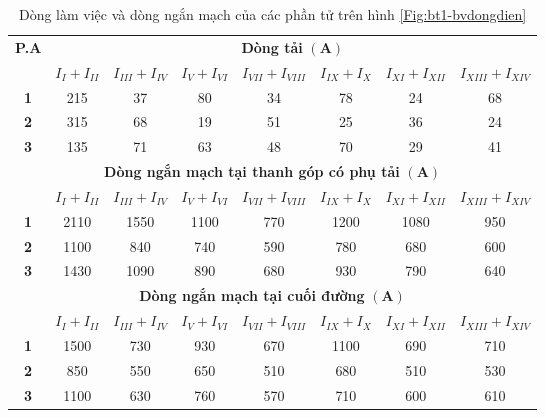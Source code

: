 \documentclass[12pt,a4paper]{article}
\begin{document}
\begin{enumerate}[1.]
			\begin{table}[!h]
				\begin{center}		
					\begin{tabular}{|c|c|c|c|c|c|c|c|} \hline 
							\multirow{2}{.7cm}{\textbf{P.A}} & \multicolumn{7}{c|}{\textbf{Dòng tải} $\mathbf{(A)}$} \\ \cline{2-8}
							 & $I_{I} + I_{II}$ & $I_{III} + I_{IV}$ & $I_{V} + I_{VI}$ & $I_{VII} + I_{VIII}$ & $I_{IX} + I_{X}$ & $I_{XI} + I_{XII}$ & $I_{XIII} + I_{XIV}$ \\ \hline
							\textbf{1} & 215 & 37 & 80 & 34 & 78 & 24 & 68 \\ \hline 
							\textbf{2} & 315 & 68 & 19 & 51 & 25 & 36 & 24 \\ \hline 
							\textbf{3} & 135 & 71 & 63 & 48 & 70 & 29 & 41 \\ \hline 
							\multicolumn{8}{|c|}{\textbf{Dòng ngắn mạch tại thanh góp có phụ tải} $\mathbf{(A)}$} \\ \hline 
							 & $I_{I} + I_{II}$ & $I_{III} + I_{IV}$ & $I_{V} + I_{VI}$ & $I_{VII} + I_{VIII}$ & $I_{IX} + I_{X}$ & $I_{XI} + I_{XII}$ & $I_{XIII} + I_{XIV}$ \\ \hline 
							\textbf{1} & 2110 & 1550 & 1100 & 770 & 1200 & 1080 & 950 \\ \hline 
							\textbf{2} & 1100 & 840 & 740 & 590 & 780 & 680 & 600 \\ \hline 
							\textbf{3} & 1430 & 1090 & 890 & 680 & 930 & 790 & 640 \\ \hline 
							\multicolumn{8}{|c|}{\textbf{Dòng ngắn mạch tại cuối đường} $\mathbf{(A)}$} \\ \hline 
							 & $I_{I} + I_{II}$ & $I_{III} + I_{IV}$ & $I_{V} + I_{VI}$ & $I_{VII} + I_{VIII}$ & $I_{IX} + I_{X}$ & $I_{XI} + I_{XII}$ & $I_{XIII} + I_{XIV}$ \\ \hline
							\textbf{1} & 1500 & 730 & 930 & 670 & 1100 & 690 & 710 \\ \hline 
							\textbf{2} & 850 & 550 & 650 & 510 & 680 & 510 & 530 \\ \hline 
							\textbf{3} & 1100 & 630 & 760 & 570 & 710 & 600 & 610 \\ \hline 
					\end{tabular}		
				\end{center}
				\caption{Dòng làm việc và dòng ngắn mạch của các phần tử trên hình \ref{Fig:bt1-bvdongdien}} \label{Tab:bt1-bvdongdien-dongdien}
			\end{table}				
			

\end{enumerate}
\end{document}
